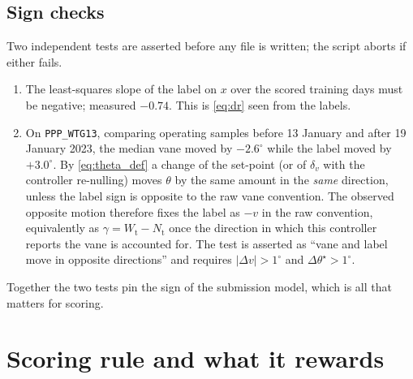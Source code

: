 \documentclass[11pt,a4paper]{article}
\theoremstyle{remark}
\newcommand{\dg}{^{\circ}}
\newcommand{\code}[1]{\texttt{#1}}
\newcommand{\Wt}{W_{\mathrm{t}}}
\newcommand{\Nt}{N_{\mathrm{t}}}
\begin{document}
\subsection{Sign checks}\label{sec:signcheck}
Two independent tests are asserted before any file is written; the script
aborts if either fails.
\begin{enumerate}
\item The least-squares slope of the label on $x$ over the scored training days
      must be negative; measured $-0.74$. This is \eqref{eq:dr} seen from the
      labels.
\item On \code{PPP\_WTG13}, comparing operating samples before 13 January and
      after 19 January 2023, the median vane moved by $-2.6\dg$ while the label
      moved by $+3.0\dg$. By \eqref{eq:theta_def} a change of the set-point (or
      of $\delta_v$ with the controller re-nulling) moves $\theta$ by the same
      amount in the \emph{same} direction, unless the label sign is opposite to
      the raw vane convention. The observed opposite motion therefore fixes the
      label as $-v$ in the raw convention, equivalently as $\gamma=\Wt-\Nt$ once
      the direction in which this controller reports the vane is accounted for.
      The test is asserted as ``vane and label move in opposite directions'' and
      requires $|\Delta v|>1\dg$ and $\Delta\theta^\star>1\dg$.
\end{enumerate}
Together the two tests pin the sign of the submission model, which is all that
matters for scoring.

\section{Scoring rule and what it rewards}\label{sec:scoring}
\end{document}
